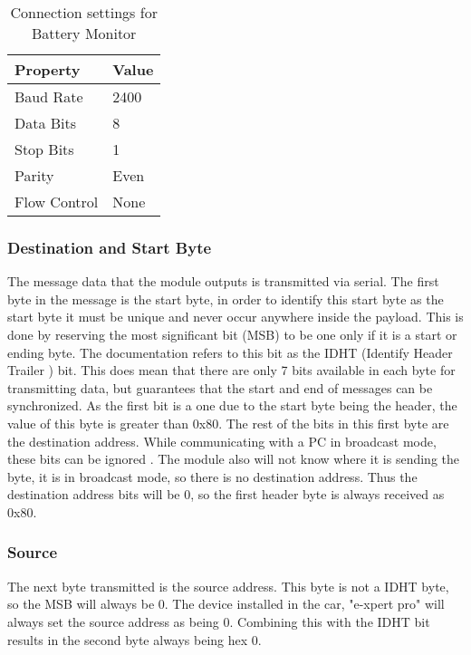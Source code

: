 \begin{table}
\begin{center}
    \begin{tabular}{|l|l|}
        \hline
        Property & Value \\ \hline
        Baud Rate    & 2400 \\
        Data Bits    & 8    \\ 
        Stop Bits    & 1    \\ 
        Parity       & Even \\ 
        Flow Control & None \\
        \hline
    \end{tabular}
	\caption{Connection settings for Battery Monitor}
\end{center}
\end{table}


\subsubsection{Destination and Start Byte}
\label{sec:expertprotocol}

The message data that the module outputs is transmitted via serial. The first byte in the message is the start byte, in order to identify this start byte as the start byte it must be unique and never occur anywhere inside the payload. This is done by reserving the most significant bit (MSB) to be one only if it is a start or ending byte. The documentation refers to this bit as the IDHT (Identify Header Trailer ) bit. This does mean that there are only 7 bits available in each byte for transmitting data, but guarantees that the start and end of messages can be synchronized. As the first bit is a one due to the start byte being the header, the value of this byte is greater than 0x80. The rest of the bits in this first byte are the destination address. While communicating with a PC in broadcast mode, these bits can be ignored \cite{e_xpert}. The module also will not know where it is sending the byte, it is in broadcast mode, so there is no destination address. Thus the destination address bits will be 0, so the first header byte is always received as 0x80.

\subsubsection{Source}

The next byte transmitted is the source address. This byte is not a IDHT byte, so the MSB will always be 0. The device installed in the car, "e-xpert pro" will always set the source address as being 0. Combining this with the IDHT bit results in the second byte always being hex 0.

